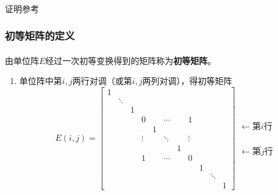 \paragraph{}
证明参考

\subsubsection{初等矩阵的定义}
\paragraph{}
由单位阵$E$经过一次初等变换得到的矩阵称为\textbf{初等矩阵}。
\begin{enumerate}
  \item 单位阵中第$i,j$两行对调（或第$i,j$两列对调），得初等矩阵
  \begin{equation*}
    E(i,j) = \left[\begin{array}{ccccccccccc}
      1 & & & & & & & & & & \\
        & \ddots & & & & & & & & & \\
        &        & 1 & & & & & & & & \\
        &        &   & 0 & & \cdots & &  1 & & & \\
        &        &   &   & 1 & & & & & & \\
        &        &   & \vdots  &   & \ddots & & \vdots & & & \\
        &        &   &   &   &        & 1 & & & & \\
        &        &   & 1 &   &    \cdots    &  & 0 &  & & \\
        &        &   &   &   &        &   &   & 1 &  & \\
        &        &   &   &   &        &   &   &   & \ddots & \\
        &        &   &   &   &        &   &   &   &        & 1
    \end{array}\right]\begin{array}{c}
      \\
      \\
      \\
      \leftarrow\text{第$i$行} \\
      \\
      \\
      \\
      \leftarrow\text{第$j$行} \\
      \\
      \\

\end{array}
\end{equation*}
\end{enumerate}
